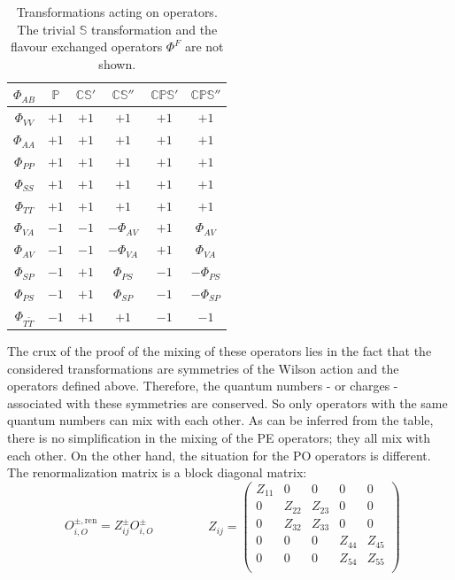 \documentclass[english, LaM, oneside, noexaminfo]{sapthesis}
\newcommand{\ren}{{\text{ren}}}
\begin{document}
\begin{table}[ht]
    \centering
    \begin{tabular}{c|ccccc}
        $\Phi_{AB}$ & $\mathbb{P}$ & $\mathbb{CS}'$ & $\mathbb{CS}''$ & $\mathbb{CPS}'$ & $\mathbb{CPS}'' $\\
        \hline
        $\Phi_{VV}$        & $+1$ & $+1$ & $+1$ & $+1$ & $+1$ \\
        $\Phi_{AA}$        & $+1$ & $+1$ & $+1$ & $+1$ & $+1$ \\
        $\Phi_{PP}$        & $+1$ & $+1$ & $+1$ & $+1$ & $+1$ \\
        $\Phi_{SS}$        & $+1$ & $+1$ & $+1$ & $+1$ & $+1$ \\
        $\Phi_{TT}$        & $+1$ & $+1$ & $+1$ & $+1$ & $+1$ \\
        \hline
        $\Phi_{VA}$        & $-1$ & $-1$ & $-\Phi_{AV}$ & $+1$ & $\Phi_{AV}$    \\
        $\Phi_{AV}$        & $-1$ & $-1$ & $-\Phi_{VA}$ & $+1$ & $\Phi_{VA}$    \\
        $\Phi_{SP}$        & $-1$ & $+1$ & $\Phi_{PS}$  & $-1$ & $-\Phi_{PS}$   \\
        $\Phi_{PS}$        & $-1$ & $+1$ & $\Phi_{SP}$  & $-1$ & $-\Phi_{SP}$   \\
        $\Phi_{T\tilde T}$ & $-1$ & $+1$ & $+1$         & $-1$ & $-1$           \\
    \end{tabular}
    \vspace*{.6mm}
    \label{tab:symmetries-of-operators}
    \caption{Transformations acting on operators. The trivial $\mathbb{S}$ transformation and the flavour exchanged operators $\Phi^F$ are not shown.}
\end{table}
\newline
The crux of the proof of the mixing of these operators lies in the fact that the considered transformations are symmetries of the Wilson action and the operators defined above.
Therefore, the quantum numbers - or charges - associated with these symmetries are conserved.
So only operators with the same quantum numbers can mix with each other.
As can be inferred from the table, there is no simplification in the mixing of the PE operators; they all mix with each other.
On the other hand, the situation for the PO operators is different.
The renormalization matrix is a block diagonal matrix:
\begin{equation*}
    \begin{split}
        O_{i,O}^{\pm,\ren} = Z_{ij}^\pm O_{i,O}^{\pm}
    \end{split}
    \qquad\qquad
    Z_{ij} = 
    \begin{pmatrix}
        Z_{11} & 0 & 0 & 0 & 0 \\
        0 & Z_{22} & Z_{23} & 0 & 0 \\
        0 & Z_{32} & Z_{33} & 0 & 0 \\
        0 & 0 & 0 & Z_{44} & Z_{45} \\
        0 & 0 & 0 & Z_{54} & Z_{55} \\
    \end{pmatrix}
\end{equation*}
\end{document}
